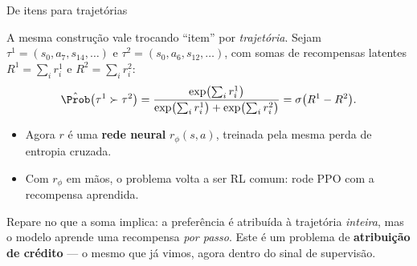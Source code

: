 \documentclass[aspectratio=169, 11pt]{beamer}
\newcommand{\rphi}{r_{\phi}}                     %
\newcommand{\traj}{\tau}
\newcommand{\sig}{\sigma}
\begin{document}
\begin{frame}{De itens para trajetórias}

  A mesma construção vale trocando ``item'' por \emph{trajetória}. Sejam
  $\traj^1 = (s_0, a_7, s_{14},\dots)$ e $\traj^2 = (s_0, a_6, s_{12},\dots)$, com
  somas de recompensas latentes $R^1 = \sum_{i} r^1_i$ e $R^2 = \sum_i r^2_i$:
  \[
    \hat{\Prob}\bigl(\traj^1 \succ \traj^2\bigr)
      = \frac{\exp\bigl(\sum_i r^1_i\bigr)}
             {\exp\bigl(\sum_i r^1_i\bigr) + \exp\bigl(\sum_i r^2_i\bigr)}
      = \sig\bigl(R^1 - R^2\bigr).
  \]

  \begin{itemize}\setlength{\itemsep}{0.3ex}
    \item Agora $r$ é uma \textbf{rede neural} $\rphi(s,a)$, treinada pela mesma
      perda de entropia cruzada.
    \item Com $\rphi$ em mãos, o problema volta a ser RL comum: rode PPO com a
      recompensa aprendida.
  \end{itemize}

  \begin{alertabox}
    Repare no que a soma implica: a preferência é atribuída à trajetória
    \emph{inteira}, mas o modelo aprende uma recompensa \emph{por passo}. Este é
    um problema de \textbf{atribuição de crédito} --- o mesmo que já vimos, agora
    dentro do sinal de supervisão.
  \end{alertabox}
\end{frame}
\end{document}
